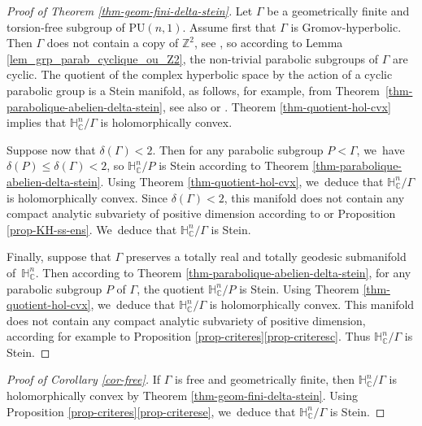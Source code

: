 \documentclass[11pt]{article}
\theoremstyle{definition}
\newcommand{\C}{\mathbb{C}}
\newcommand{\Z}{\mathbb{Z}}
\newcommand{\HNC}{\mathbb{H}^{n}_{\C}}
\newcommand{\PU}{\mathrm{PU}}
\def\C{\mathbb{C}}
\newcommand{\HNC}{\mathbb{H}^{n}_{\C}}
\newcommand{\PU}{\mathrm{PU}}
\begin{document}
\begin{proof}[Proof of Theorem \ref{thm-geom-fini-delta-stein}]
Let $\Gamma$ be a geometrically finite and torsion-free subgroup of $\PU(n,1)$. Assume first that $\Gamma$ is Gromov-hyperbolic. Then $\Gamma$ does not contain a copy of $\Z^{2}$, see \cite[Cor.\,III.$\Gamma$.3.10]{bridsonMetricSpacesNonpositive1999}, so according to Lemma \ref{lem_grp_parab_cyclique_ou_Z2}, the non-trivial parabolic subgroups of $\Gamma$ are cyclic. The quotient of the complex hyperbolic space by the action of a cyclic parabolic group is a Stein manifold, as follows, for example, from Theorem~\ref{thm-parabolique-abelien-delta-stein}, see also \cite{defabritiisQuotientsUnitBall2001manuel} or \cite{miebachQuotientsBoundedHomogeneous2010}. Theorem \ref{thm-quotient-hol-cvx} implies that $\HNC/\Gamma$ is holomorphically convex.

Suppose now that $\delta(\Gamma)<2$. Then for any parabolic subgroup $P<\Gamma$, we~have $\delta(P)\le \delta(\Gamma)<2$, so $\HNC/P$ is Stein according to Theorem \ref{thm-parabolique-abelien-delta-stein}. Using Theorem \ref{thm-quotient-hol-cvx}, we~deduce that $\HNC/\Gamma$ is holomorphically convex. Since $\delta(\Gamma)<2$, this manifold does not contain any compact analytic subvariety of positive dimension according to \cite[Th.\,15]{deyNoteComplexhyperbolicKleinian2020} or Proposition \ref{prop-KH-ss-ens}. We~deduce that $\HNC/\Gamma$ is Stein.

Finally, suppose that $\Gamma$ preserves a totally real and totally geodesic submanifold of~$\HNC$. Then according to Theorem \ref{thm-parabolique-abelien-delta-stein}, for any parabolic subgroup $P$ of $\Gamma$, the quotient $\HNC/P$ is Stein. Using Theorem \ref{thm-quotient-hol-cvx}, we~deduce that $\HNC/\Gamma$ is holomorphically convex. This manifold does not contain any compact analytic subvariety of positive dimension, according for example to Proposition \ref{prop-criteres}\eqref{prop-criteresc}. Thus $\HNC/\Gamma$ is Stein.
\end{proof}

\begin{proof}[Proof of Corollary \ref{cor-free}]
If $\Gamma$ is free and geometrically finite, then $\HNC/\Gamma$ is holomorphically convex by Theorem \ref{thm-geom-fini-delta-stein}. Using Proposition \ref{prop-criteres}\eqref{prop-criterese}, we~deduce that $\HNC/\Gamma$ is Stein.
\end{proof}
\end{document}
